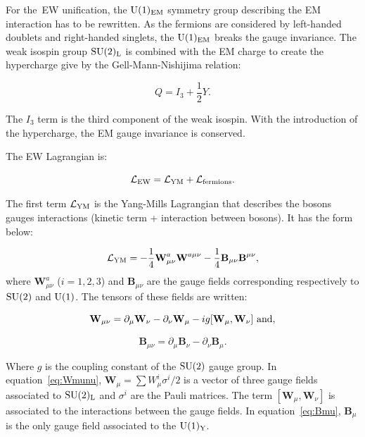     For the~\gls{EW} unification, the $\rm{U}(1)_{\rm{EM}}$ symmetry group describing  the \gls{EM} interaction has to be rewritten.
    As the fermions are considered by left-handed doublets and right-handed singlets, the $\rm{U}(1)_{\rm{EM}}$ breaks the gauge invariance.
    The weak isospin group $\rm{SU}(2)_{\rm{L}}$ is combined with the EM charge to create the hypercharge give by the Gell-Mann-Nishijima relation: 
  
    \begin{equation}
      Q = I_3 + \frac{1}{2}Y.
    \end{equation}
   
    The $I_3$ term is the third component of the weak isospin.
    With the introduction of the hypercharge, the EM gauge invariance is conserved.

    The \gls{EW} Lagrangian is:

    \begin{equation}
      \mathcal{L}_{\rm{EW}} = \mathcal{L}_{\rm{YM}} + \mathcal{L}_{\rm{fermions}}.
      \label{eq:ewLag}
    \end{equation}

    The first term $\mathcal{L}_{\rm{YM}}$ is the Yang-Mills Lagrangian that describes the bosons gauges interactions (kinetic term + interaction between bosons). 
    It has the form below:

    \begin{equation}
      \mathcal{L}_{\rm{YM}} = - \frac{1}{4}\textbf{W}^a_{\mu\nu} \textbf{W}^{a\mu\nu} - \frac{1}{4}\textbf{B}_{\mu\nu}\textbf{B}^{\mu\nu},
    \end{equation}
    where $\textbf{W}^{a}_{\mu\nu}$ ($i=1,2,3$) and $\textbf{B}_{\mu\nu}$ are the gauge fields corresponding respectively to $\rm{SU}(2)$ and $\rm{U}(1)$.
    The tensors of these fields are written:

    \begin{equation}
        \textbf{W}_{\mu\nu}  =  \partial_{\mu}\textbf{W}_{\nu} - \partial_{\nu}\textbf{W}_{\mu} - i g [\textbf{W}_{\mu},\textbf{W}_{\nu}]~\rm{and}
      \label{eq:Wmunu},
    \end{equation}

    \begin{equation}
        \textbf{B}_{\mu\nu}  =  \partial_{\mu}\textbf{B}_{\nu} - \partial_{\nu}\textbf{B}_{\mu}.
        \label{eq:Bmu}
    \end{equation}
   
    Where $g$ is the coupling constant of the $\rm{SU}(2)$ gauge group. 
    In equation~\ref{eq:Wmunu}, $\textbf{W}_{\mu} = \sum W^i_{\mu}\sigma^i/2$ is a vector of three gauge fields associated to $\rm{SU}(2)_{\rm{L}}$ and $\sigma^i$ are the Pauli matrices. 
    The term $[\textbf{W}_{\mu},\textbf{W}_{\nu}]$ is associated to the interactions between the gauge fields.
    In equation~\ref{eq:Bmu}, $\textbf{B}_{\mu}$ is the only gauge field associated to the $\rm{U}(1)_{\rm{Y}}$.

